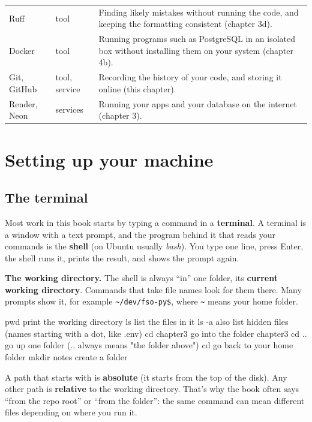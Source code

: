 \begin{center}
\begin{tabularx}{\textwidth}{@{}l l X@{}}
Ruff & tool & Finding likely mistakes without running the code, and keeping the formatting consistent (chapter 3d). \\
Docker & tool & Running programs such as PostgreSQL in an isolated box without installing them on your system (chapter 4b). \\
Git, GitHub & tool, service & Recording the history of your code, and storing it online (this chapter). \\
Render, Neon & services & Running your apps and your database on the internet (chapter 3). \\
\bottomrule
\end{tabularx}
\end{center}

\section{Setting up your machine}

\subsection{The terminal}

Most work in this book starts by typing a command in a \textbf{terminal}. A terminal is a window with a text prompt, and the program behind it that reads your commands is the \textbf{shell} (on Ubuntu usually \emph{bash}). You type one line, press Enter, the shell runs it, prints the result, and shows the prompt again.

\textbf{The working directory.} The shell is always ``in'' one folder, its \textbf{current working directory}. Commands that take file names look for them there. Many prompts show it, for example \texttt{\textasciitilde/dev/fso-py\$}, where \texttt{\textasciitilde} means your home folder.

\begin{code}
pwd                  print the working directory
ls                   list the files in it
ls -a                also list hidden files (names starting with a dot, like .env)
cd chapter3          go into the folder chapter3
cd ..                go up one folder (.. always means "the folder above")
cd                   go back to your home folder
mkdir notes          create a folder
\end{code}

A path that starts with \cd{/} is \textbf{absolute} (it starts from the top of the disk). Any other path is \textbf{relative} to the working directory. That's why the book often says ``from the repo root'' or ``from the  folder'': the same command can mean different files depending on where you run it.

